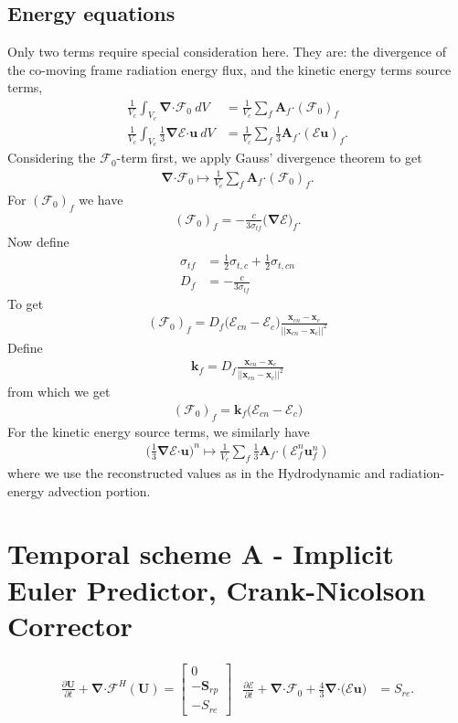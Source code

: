 \documentclass[10pt,letterpaper,notitlepage]{article}
\numberwithin{equation}{section}
\newcommand{\partialderiv}[2]{\frac{\partial #1}{\partial #2}}
\newcommand{\bnabla}{\boldsymbol{\nabla}}
\newcommand{\position}{\mathbf{x}}
\newcommand{\velocity}{\mathbf{u}}
\newcommand{\dotp}{\boldsymbol{\cdot}}
\newcommand{\RadE}{\mathcal{E}}
\newcommand{\RadF}{\boldsymbol{\mathcal{F}}}
\newcommand{\HydroF}{\mathcal{F}^H}
\newcommand{\HydroU}{\mathbf{U}}
\newcommand{\RadJ}{\RadF_0}
\newcommand{\AreaVec}{\mathbf{A}}
\newcommand{\half}{\frac{1}{2}}
\newcommand{\beqn}{\begin{equation}\begin{aligned}}
\newcommand{\eeqn}{\end{aligned}\end{equation}}
\begin{document}
\subsection{Energy equations}
\label{section:fv_energy_equations}
Only two terms require special consideration here. They are: the divergence of the co-moving frame radiation energy flux, and the kinetic energy terms source terms,
\beqn 
\frac{1}{V_c} \int_{V_c} \bnabla \dotp \RadJ \ dV &= \frac{1}{V_c} \sum_f \AreaVec_f \dotp (\RadJ)_f \\
\frac{1}{V_c} \int_{V_c} \frac{1}{3} \bnabla \RadE \dotp \velocity \ dV &= \frac{1}{V_c} \sum_f \frac{1}{3} \AreaVec_f \dotp (\RadE \velocity)_f.
\eeqn 
Considering the $\RadJ$-term first, we apply Gauss' divergence theorem to get
\beqn 
\bnabla \dotp \RadJ \mapsto \frac{1}{V_c} \sum_f \AreaVec_f \dotp (\RadJ)_f.
\eeqn 
For $(\RadJ)_f$ we have
\beqn 
(\RadJ)_f = - \frac{c}{3\sigma_{tf}} \bigr(\bnabla \RadE \bigr)_f.
\eeqn 
Now define
\beqn
\sigma_{tf} &= \half \sigma_{t,c} + \half \sigma_{t,cn} \\
D_f &= - \frac{c}{3\sigma_{tf}}
\eeqn 
To get
\beqn 
(\RadJ)_f = D_f \bigr( \RadE_{cn} - \RadE_{c} \bigr) \frac{\position_{cn} - \position_{c}}{|| \position_{cn} - \position_{c} ||^2}
\eeqn 
Define
\beqn 
\mathbf{k}_f = D_f \frac{\position_{cn} - \position_{c}}{|| \position_{cn} - \position_{c} ||^2}
\eeqn 
from which we get
\beqn 
(\RadJ)_f = \mathbf{k}_f \bigr( \RadE_{cn} - \RadE_{c} \bigr)
\eeqn 
\newline
\newline
For the kinetic energy source terms, we similarly have
\beqn 
\biggr( \frac{1}{3} \bnabla \RadE \dotp \velocity \biggr)^n
\mapsto 
\frac{1}{V_c} \sum_f \frac{1}{3} \AreaVec_f \dotp (\RadE_f^n \velocity_f^n)
\eeqn 
where we use the reconstructed values as in the Hydrodynamic and radiation-energy advection portion.

\newpage
\section{Temporal scheme A - Implicit Euler Predictor, Crank-Nicolson Corrector}
\begin{subequations}
\beqn 
\partialderiv{\HydroU}{t} + \bnabla \dotp \HydroF(\HydroU) = 
\begin{bmatrix}
	0 \\
	-\mathbf{S}_{rp} \\
	-S_{re} 
\end{bmatrix}
\eeqn 
\beqn 
\frac{\partial \RadE}{\partial t} 
+\bnabla \dotp \RadJ  + \frac{4}{3} \bnabla \dotp \bigr( \RadE \mathbf{u}  \bigr)
&=  S_{re}.
\eeqn
\end{subequations}
\end{document}
